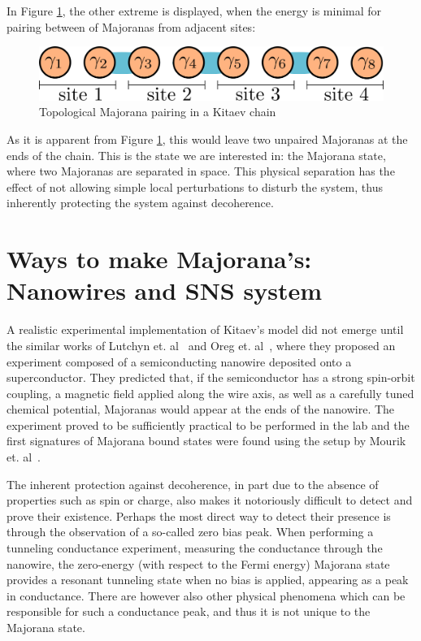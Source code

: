 	In Figure \ref{fig:topological_majoranas}, the other extreme is displayed, when the energy is minimal for pairing between of Majoranas from adjacent sites:
	\begin{figure}[htb!]
	\centering
	\includegraphics[width=0.95\columnwidth]{images/majorana_topological_pairing}
	\caption{Topological Majorana pairing in a Kitaev chain}
	\label{fig:topological_majoranas}
	\end{figure}
		
	As it is apparent from Figure \ref{fig:topological_majoranas}, this would leave two unpaired Majoranas at the ends of the chain.
	This is the state we are interested in: the Majorana state, where two Majoranas are separated in space.
	This physical separation has the effect of not allowing simple local perturbations to disturb the system, thus inherently protecting the system against decoherence.


\section{Ways to make Majorana's: Nanowires and SNS system}

	A realistic experimental implementation of Kitaev's model did not emerge until the similar works of Lutchyn et. al~\cite{lutchyn_majorana_2010} and Oreg et. al~\cite{ oreg_helical_2010}, where they proposed an experiment composed of a semiconducting nanowire deposited onto a superconductor.
	They predicted that, if the semiconductor has a strong spin-orbit coupling, a magnetic field applied along the wire axis, as well as a carefully tuned chemical potential, Majoranas would appear at the ends of the nanowire.
	The experiment proved to be sufficiently practical to be performed in the lab and the first signatures of Majorana bound states were found using the setup by Mourik et. al~\cite{mourik_signatures_2012}.

	The inherent protection against decoherence, in part due to the absence of properties such as spin or charge, also makes it notoriously difficult to detect and prove their existence.
	Perhaps the most direct way to detect their presence is through the observation of a so-called zero bias peak.
	When performing a tunneling conductance experiment, measuring the conductance through the nanowire, the zero-energy (with respect to the Fermi energy) Majorana state provides a resonant tunneling state when no bias is applied, appearing as a peak in conductance.
	There are however also other physical phenomena which can be responsible for such a conductance peak, and thus it is not unique to the Majorana state.

